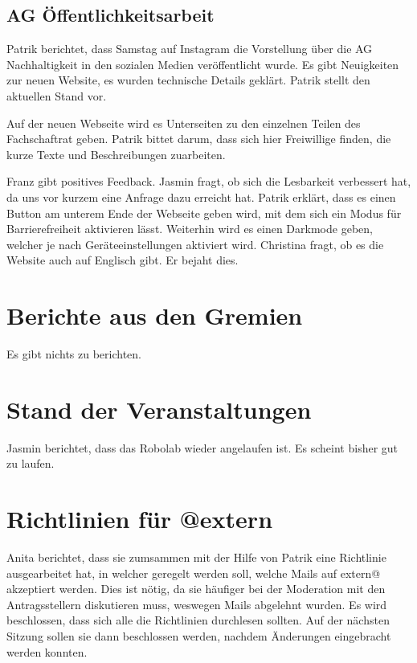 \documentclass{fsrprotokoll}
\begin{document}
\subsection{AG Öffentlichkeitsarbeit}

Patrik berichtet, dass Samstag auf Instagram die Vorstellung über die AG Nachhaltigkeit in den sozialen Medien veröffentlicht wurde. Es gibt Neuigkeiten zur neuen Website, es wurden technische Details geklärt. Patrik stellt den aktuellen Stand vor.


Auf der neuen Webseite wird es Unterseiten zu den einzelnen Teilen des Fachschaftrat geben. Patrik bittet darum, dass sich hier Freiwillige finden, die kurze Texte und Beschreibungen zuarbeiten.

Franz gibt positives Feedback. Jasmin fragt, ob sich die Lesbarkeit verbessert hat, da uns vor kurzem eine Anfrage dazu erreicht hat.
Patrik erklärt, dass es einen Button am unterem Ende der Webseite geben wird, mit dem sich ein Modus für Barrierefreiheit aktivieren lässt. Weiterhin wird es einen Darkmode geben,  welcher je nach Geräteeinstellungen aktiviert wird.
Christina fragt, ob es die Website auch auf Englisch gibt. Er bejaht dies.

\section{Berichte aus den Gremien}
Es gibt nichts zu berichten.

\section{Stand der Veranstaltungen}
Jasmin berichtet, dass das Robolab wieder angelaufen ist. Es scheint bisher gut zu laufen.

\section{Richtlinien für @extern}
Anita berichtet, dass sie zumsammen mit der Hilfe von Patrik eine Richtlinie ausgearbeitet hat, in welcher geregelt werden soll, welche Mails auf extern@ akzeptiert werden. Dies ist nötig, da sie häufiger bei der Moderation mit den Antragsstellern diskutieren muss, weswegen Mails abgelehnt wurden. Es wird beschlossen, dass sich alle die Richtlinien durchlesen sollten. Auf der nächsten Sitzung sollen sie dann beschlossen werden, nachdem Änderungen eingebracht werden konnten.
\end{document}
